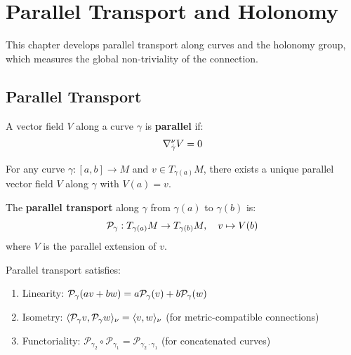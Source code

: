 
\chapter{Parallel Transport and Holonomy}
\label{ch:holonomy}

\begin{tcolorbox}[colback=blue!5!white,colframe=blue!75!black,title=\vnewfour]
This chapter develops parallel transport along curves and the holonomy
group, which measures the global non-triviality of the connection.
\end{tcolorbox}

\section{Parallel Transport}

\begin{definition}
\label{def:parallel-field}
A vector field $V$ along a curve $\gamma$ is \textbf{parallel} if:
\[
    \nabla^\nu_{\dot{\gamma}} V = 0
\]
\end{definition}

\begin{theorem}
\label{thm:parallel-transport-exists}
For any curve $\gamma : [a, b] \to M$ and $v \in T_{\gamma(a)}M$, there
exists a unique parallel vector field $V$ along $\gamma$ with $V(a) = v$.
\end{theorem}

\begin{definition}
\label{def:parallel-transport-map}
The \textbf{parallel transport} along $\gamma$ from $\gamma(a)$ to $\gamma(b)$ is:
\[
    \mathcal{P}_\gamma : T_{\gamma(a)}M \to T_{\gamma(b)}M, \quad v \mapsto V(b)
\]
where $V$ is the parallel extension of $v$.
\end{definition}

\begin{proposition}
\label{prop:parallel-properties}
Parallel transport satisfies:
\begin{enumerate}[label=(\alph*)]
    \item Linearity: $\mathcal{P}_\gamma(av + bw) = a\mathcal{P}_\gamma(v) + b\mathcal{P}_\gamma(w)$
    \item Isometry: $\langle \mathcal{P}_\gamma v, \mathcal{P}_\gamma w \rangle_\nu
          = \langle v, w \rangle_\nu$ (for metric-compatible connections)
    \item Functoriality: $\mathcal{P}_{\gamma_2} \circ \mathcal{P}_{\gamma_1}
          = \mathcal{P}_{\gamma_2 \cdot \gamma_1}$ (for concatenated curves)
\end{enumerate}
\end{proposition}

